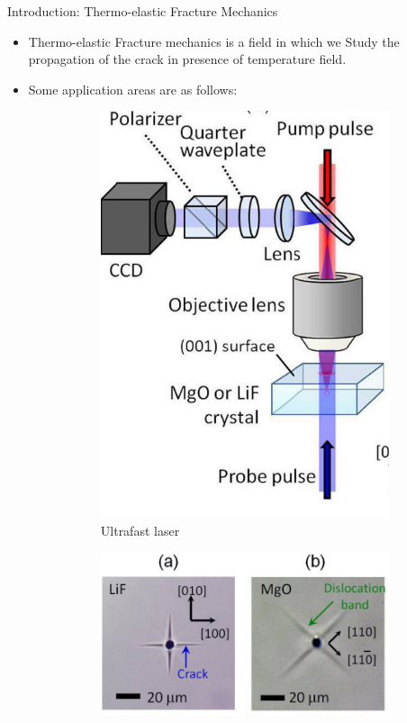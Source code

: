 \documentclass{beamer}
\begin{document}
\begin{frame}[t,fragile]{Introduction: Thermo-elastic Fracture Mechanics}
    \vspace{-.3cm}
    \begin{itemize}
         \item Thermo-elastic Fracture mechanics is a field in which we Study the propagation of the crack in presence of temperature field.
                \item Some application areas are as follows:
\begin{figure}[H]
      \begin{subfigure}{0.45\textwidth}
    \centering
    \includegraphics[scale=.1]{m}
 \vspace{-.2cm}
 \caption{\tiny Ultrafast laser}
 \end{subfigure}
\begin{subfigure}{0.45\textwidth}
    \centering
    \includegraphics[scale=.1]{l}

\end{subfigure}
\end{figure}
\end{itemize}
\end{frame}
\end{document}
